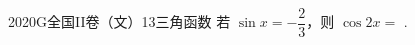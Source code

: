 
\begin{problem}{2020}{G}{全国II卷（文）}{13}{三角函数}
若 $ \sin x=-\dfrac{2}{3} $，则 $ \cos 2x= $ \underline{\hspace{4em}}.
\end{problem}

\begin{answer}

\end{answer}

\begin{solutions}

\end{solutions}